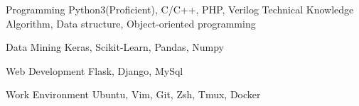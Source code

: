 

\begin{cvskills}

  \cvskill
    {Programming} %
    {Python3(Proficient), C/C++, PHP, Verilog} %
  \cvskill
    {Technical Knowledge} %
    {Algorithm, Data structure, Object-oriented programming} %

  \cvskill
    {Data Mining} %
    {Keras, Scikit-Learn, Pandas, Numpy} %

  \cvskill
    {Web Development} %
    {Flask, Django, MySql} %

  \cvskill
    {Work Environment} %
    {Ubuntu, Vim, Git, Zsh, Tmux, Docker} %

\end{cvskills}
